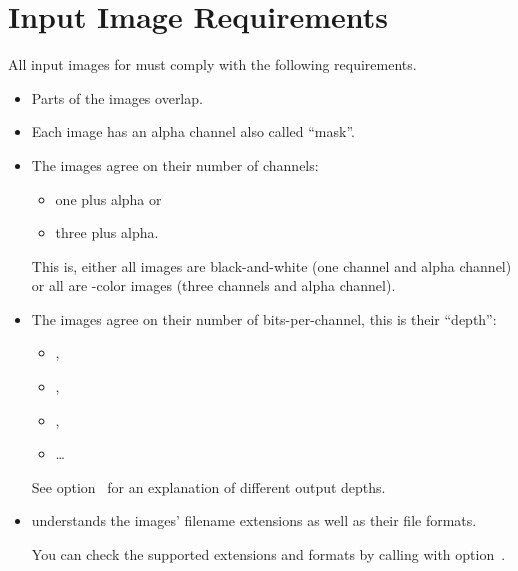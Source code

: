 

\section[Image Requirements]{\label{sec:image-requirements}%
  Input Image Requirements}

All input images for \App{} must comply with the following requirements.

\begin{itemize}
\item
  Parts of the images overlap.

\item
  Each image has an alpha channel also called ``mask''.

\item
  The images agree on their number of channels:

  \begin{itemize}
  \item
    one plus alpha or

  \item
    three plus alpha.
  \end{itemize}


  This is, either all images are black-and-white (one channel and alpha channel) or all are
  -color images (three channels and alpha channel).

\item
  The images agree on their number of bits-per-channel, this is their ``depth'':

  \begin{itemize}
  \item
    ,

  \item
    ,

  \item
    ,

  \item
    \dots
  \end{itemize}

  See option~ for an explanation of different output
  depths.

\item
  \App{} understands the images' filename extensions as well as their file formats.

  You can check the supported extensions and formats by calling \App{} with
  option~.
\end{itemize}

